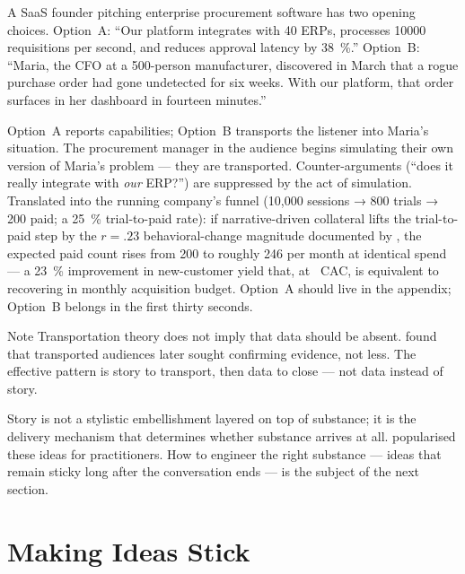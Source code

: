 \begin{example}
A SaaS founder pitching enterprise procurement software has two opening choices. Option~A:
``Our platform integrates with 40 ERPs, processes \num{10000} requisitions per second, and
reduces approval latency by \qty{38}{\percent}.'' Option~B: ``Maria, the CFO at a
\num{500}-person manufacturer, discovered in March that a rogue purchase order had gone
undetected for six weeks. With our platform, that order surfaces in her dashboard in
fourteen minutes.''

Option~A reports capabilities; Option~B transports the listener into Maria's situation.
The procurement manager in the audience begins simulating their own version of Maria's
problem — they are transported. Counter-arguments (``does it really integrate with
\emph{our} ERP?'') are suppressed by the act of simulation. Translated into the running
company's funnel (10,000 sessions → 800 trials → 200 paid; a \qty{25}{\percent}
trial-to-paid rate): if narrative-driven collateral lifts the trial-to-paid step by the
\(r = .23\) behavioral-change magnitude documented by \textcite{braddock2016narrative},
the expected paid count rises from 200 to roughly 246 per month at identical spend — a
\qty{23}{\percent} improvement in new-customer yield that, at ~CAC, is
equivalent to recovering  in monthly acquisition budget. Option~A should
live in the appendix; Option~B belongs in the first thirty seconds.
\end{example}

\begin{admonition}{Note}
Transportation theory does not imply that data should be absent. \textcite{green2000narrative}
found that transported audiences later sought confirming evidence, not less. The effective
pattern is story to transport, then data to close — not data instead of story.
\end{admonition}

Story is not a stylistic embellishment layered on top of substance; it is the delivery
mechanism that determines whether substance arrives at all. \textcite{heath2007madetostick}
popularised these ideas for practitioners. How to engineer the right substance — ideas that
remain sticky long after the conversation ends — is the subject of the next section.

\section{Making Ideas Stick}\label{sec:made-to-stick}

